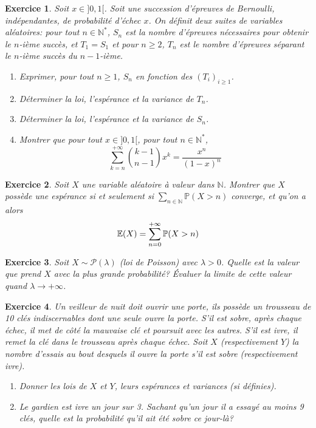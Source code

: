 \documentclass[12pt]{article}
\newtheorem{exercise}{Exercice}[section]
\theoremstyle{remark}
\theoremstyle{remark}
\newcommand{\N}{\mathbb{N}} \newcommand{\Z}{\mathbb{Z}}
\renewcommand{\P}{\mathbb{P}} \newcommand{\im}{\emph{Im}}
\begin{document}
\begin{exercise}
	Soit $x\in]0,1[$. Soit une succession d'épreuves de Bernoulli, indépendantes,
	de probabilité d'échec $x$. On définit deux suites de variables aléatoires:
	pour tout $n\in\N^{*}$, $S_{n}$ est la nombre d'épreuves nécessaires pour
	obtenir le $n$-ième succès, et $T_{1}=S_{1}$ et pour $n\geqslant2$, $T_{n}$
	est le nombre d'épreuves séparant le $n$-ième succès du $n-1$-ième.
	\begin{enumerate}
		\item
		Exprimer, pour tout $n\geqslant1$, $S_{n}$ en fonction des
		$(T_{i})_{i\geqslant1}$.
		\item
		Déterminer la loi, l'espérance et la variance de $T_{n}$.
		\item
		Déterminer la loi, l'espérance et la variance de $S_{n}$.
		\item
		Montrer que pour tout $x\in]0,1[$, pour tout $n\in\N^{*}$,
		$$\sum_{k=n}^{+\infty}\binom{k-1}{n-1}x^{k}=\frac{x^{n}}{(1-x)^{n}}$$
	\end{enumerate}
\end{exercise}

\begin{exercise}
Soit $X$ une variable aléatoire à valeur dans $\N$. Montrer que $X$ possède une
espérance si et seulement si $\sum_{n\in\N}\P(X>n)$ converge, et qu'on a alors
$$\E(X)=\sum_{n=0}^{+\infty}\P(X>n)$$
\end{exercise}

\begin{exercise}
	Soit $X\sim\mathcal{P}(\lambda)$ (loi de Poisson) avec $\lambda>0$. Quelle est
	la valeur que prend $X$ avec la plus grande probabilité? Évaluer la limite de
	cette valeur quand $\lambda\to+\infty$.
\end{exercise}

\begin{exercise}
	Un veilleur de nuit doit ouvrir une porte, ils possède un trousseau de 10 clés
	indiscernables dont une seule ouvre la porte. S'il est sobre, après chaque
	échec, il met de côté la mauvaise clé et poursuit avec les autres. S'il est
	ivre, il remet la clé dans le trousseau après chaque échec. Soit $X$
	(respectivement $Y$) la nombre d'essais au bout desquels il ouvre la porte
	s'il est sobre (respectivement ivre).
	\begin{enumerate}
		\item
		Donner les lois de $X$ et $Y$, leurs espérances et variances (si
		définies).
		\item
		Le gardien est ivre un jour sur 3. Sachant qu'un jour il a essayé au moins
		9 clés, quelle est la probabilité qu'il ait été sobre ce jour-là?
	\end{enumerate}
\end{exercise}
\end{document}
